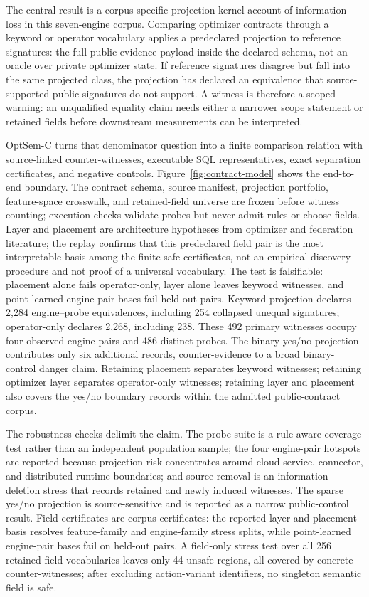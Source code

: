 The central result is a corpus-specific projection-kernel account of information loss in this seven-engine corpus.  Comparing optimizer contracts through a keyword or operator vocabulary applies a predeclared projection to reference signatures: the full public evidence payload inside the declared schema, not an oracle over private optimizer state.  If reference signatures disagree but fall into the same projected class, the projection has declared an equivalence that source-supported public signatures do not support.  A witness is therefore a scoped warning: an unqualified equality claim needs either a narrower scope statement or retained fields before downstream measurements can be interpreted.

OptSem-C turns that denominator question into a finite comparison relation with source-linked counter-witnesses, executable SQL representatives, exact separation certificates, and negative controls.  Figure~\ref{fig:contract-model} shows the end-to-end boundary.  The contract schema, source manifest, projection portfolio, feature-space crosswalk, and retained-field universe are frozen before witness counting; execution checks validate probes but never admit rules or choose fields.  Layer and placement are architecture hypotheses from optimizer and federation literature; the replay confirms that this predeclared field pair is the most interpretable basis among the finite safe certificates, not an empirical discovery procedure and not proof of a universal vocabulary.  The test is falsifiable: placement alone fails operator-only, layer alone leaves keyword witnesses, and point-learned engine-pair bases fail held-out pairs.  Keyword projection declares 2,284 engine--probe equivalences, including 254 collapsed unequal signatures; operator-only declares 2,268, including 238.  These 492 primary witnesses occupy four observed engine pairs and 486 distinct probes.  The binary yes/no projection contributes only six additional records, counter-evidence to a broad binary-control danger claim.  Retaining placement separates keyword witnesses; retaining optimizer layer separates operator-only witnesses; retaining layer and placement also covers the yes/no boundary records within the admitted public-contract corpus.

The robustness checks delimit the claim.  The probe suite is a rule-aware coverage test rather than an independent population sample; the four engine-pair hotspots are reported because projection risk concentrates around cloud-service, connector, and distributed-runtime boundaries; and source-removal is an information-deletion stress that records retained and newly induced witnesses.  The sparse yes/no projection is source-sensitive and is reported as a narrow public-control result.  Field certificates are corpus certificates: the reported layer-and-placement basis resolves feature-family and engine-family stress splits, while point-learned engine-pair bases fail on held-out pairs.  A field-only stress test over all 256 retained-field vocabularies leaves only 44 unsafe regions, all covered by concrete counter-witnesses; after excluding action-variant identifiers, no singleton semantic field is safe.

